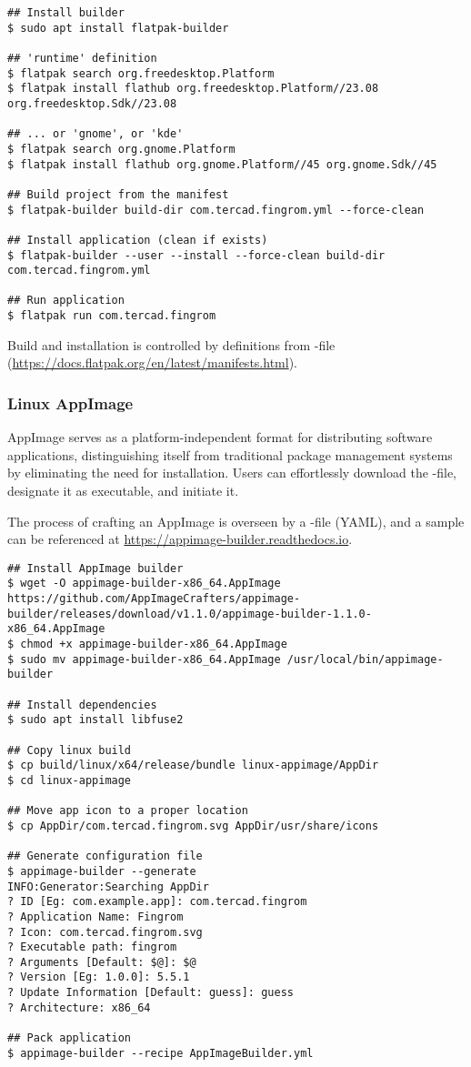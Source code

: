 \begin{lstlisting}[language=terminal]
## Install builder
$ sudo apt install flatpak-builder

## 'runtime' definition
$ flatpak search org.freedesktop.Platform
$ flatpak install flathub org.freedesktop.Platform//23.08 org.freedesktop.Sdk//23.08

## ... or 'gnome', or 'kde'
$ flatpak search org.gnome.Platform
$ flatpak install flathub org.gnome.Platform//45 org.gnome.Sdk//45

## Build project from the manifest
$ flatpak-builder build-dir com.tercad.fingrom.yml --force-clean

## Install application (clean if exists)
$ flatpak-builder --user --install --force-clean build-dir com.tercad.fingrom.yml

## Run application
$ flatpak run com.tercad.fingrom
\end{lstlisting}

\noindent Build and installation is controlled by definitions from -file
(\href{https://docs.flatpak.org/en/latest/manifests.html}{https://docs.flatpak.org/en/latest/manifests.html}).


\subsubsection{Linux AppImage}

AppImage serves as a platform-independent format for distributing software applications, distinguishing itself from 
traditional package management systems by eliminating the need for installation. Users can effortlessly download the 
-file, designate it as executable, and initiate it.

The process of crafting an AppImage is overseen by a -file (YAML), and a sample can be referenced at 
\href{https://appimage-builder.readthedocs.io}{https://appimage-builder.readthedocs.io}.

\begin{lstlisting}[language=terminal]
## Install AppImage builder
$ wget -O appimage-builder-x86_64.AppImage https://github.com/AppImageCrafters/appimage-builder/releases/download/v1.1.0/appimage-builder-1.1.0-x86_64.AppImage
$ chmod +x appimage-builder-x86_64.AppImage
$ sudo mv appimage-builder-x86_64.AppImage /usr/local/bin/appimage-builder

## Install dependencies
$ sudo apt install libfuse2

## Copy linux build
$ cp build/linux/x64/release/bundle linux-appimage/AppDir
$ cd linux-appimage

## Move app icon to a proper location
$ cp AppDir/com.tercad.fingrom.svg AppDir/usr/share/icons

## Generate configuration file
$ appimage-builder --generate
INFO:Generator:Searching AppDir
? ID [Eg: com.example.app]: com.tercad.fingrom
? Application Name: Fingrom
? Icon: com.tercad.fingrom.svg
? Executable path: fingrom
? Arguments [Default: $@]: $@
? Version [Eg: 1.0.0]: 5.5.1
? Update Information [Default: guess]: guess
? Architecture: x86_64

## Pack application
$ appimage-builder --recipe AppImageBuilder.yml
\end{lstlisting}
